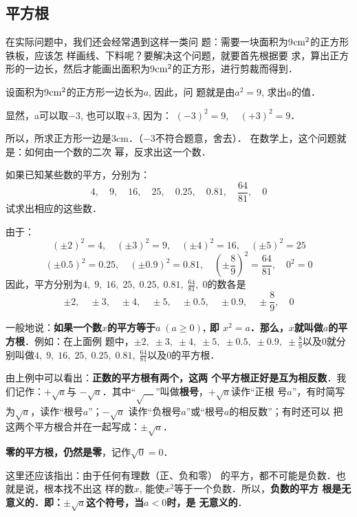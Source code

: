 \subsection{平方根}
在实际问题中，我们还会经常遇到这样一类问
题：需要一块面积为9${\rm cm}^2$的正方形铁板，应该怎
样画线、下料呢？要解决这个问题，就要首先根据要
求，算出正方形的一边长，然后才能画出面积为9${\rm cm}^2$的正方形，进行剪裁而得到．

设面积为9${\rm cm}^2$的正方形一边长为$a$, 因此，问
题就是由$a^2=9$, 求出$a$的值．

显然，a可以取$-3$, 也可以取$+3$, 因为：
$(-3)^2=9,\quad (+3)^2=9$．

所以，所求正方形一边是3cm．（$-3$不符合题意，舍去）．
在数学上，这个问题就是：如何由一个数的二次
幂，反求出这一个数．

\begin{example}
    如果已知某些数的平方，分别为：
$$4,\quad 9,\quad 16,\quad 25,\quad 0.25,\quad 0.81,\quad \frac{64}{81},\quad 0$$
试求出相应的这些数．
\end{example}

\begin{solution}
由于：   
\[(\pm 2)^2=4,\quad  (\pm 3)^2=9,\quad (\pm 4)^2=16,\quad (\pm 5)^2=25\]
\[(\pm 0.5)^2=0.25,\quad (\pm 0.9)^2=0.81,\quad \left(\pm \frac{8}{9}\right)^2=\frac{64}{81},\quad 0^2=0 \]
因此，平方分别为$4,\; 9,\; 16,\; 25,\; 0.25,\; 0.81,\; \frac{64}{81},\; 0$的数各是
$$\pm 2,\quad \pm 3,\quad\pm 4,\quad\pm 5,\quad\pm 0.5,\quad\pm 0.9,\quad
\pm \frac{8}{9},\quad 0$$
\end{solution}

一般地说：\textbf{如果一个数$x$的平方等于$a\; (a\ge 0)$, 即
$x^2=a$．那么，$x$就叫做$a$的平方根}．例如：在上面例
题中，$\pm 2,\; \pm 3,\;\pm 4,\;\pm 5,\;\pm 0.5,\;\pm 0.9,\;
\pm \frac{8}{9}$以及0就分别叫做$4,\; 9,\; 16,\; 25,\; 0.25,\; 0.81,\; \frac{64}{81}$以及0的平方根．

由上例中可以看出：\textbf{正数的平方根有两个，这两
个平方根正好是互为相反数}．我们记作：$+\sqrt{a}$与
$-\sqrt{a}$．其中“$\sqrt{\quad}$”叫做\textbf{根号}，$+\sqrt{a}$读作“正根
号$a$”，有时简写为$\sqrt{a}$，读作“根号$a$”；$-\sqrt{a}$
读作“负根号$a$”或“根号$a$的相反数”；有时还可以
把这两个平方根合并在一起写成：$\pm \sqrt{a}$．

\textbf{零的平方根，仍然是零}，记作$\sqrt{0}=0$．

这里还应该指出：由于任何有理数（正、负和零）
的平方，都不可能是负数．也就是说，根本找不出这
样的数$x$, 能使$x^2$等于一个负数．所以，\textbf{负数的平方
根是无意义的．即：$\pm \sqrt{a}$这个符号，当$a<0$时，是
无意义的}．

